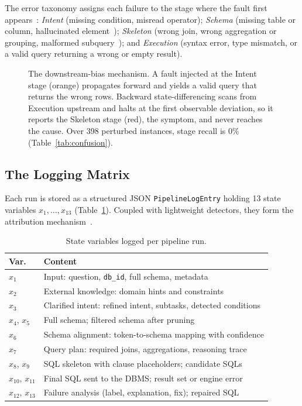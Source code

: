 \documentclass{llncs}
\begin{document}
The error taxonomy assigns each failure to the stage where the fault first
appears~\cite{shen_icl_errors_2026}: \emph{Intent} (missing condition,
misread operator); \emph{Schema} (missing table or column, hallucinated
element~\cite{chang_drspider_2023,lei_emlc_2026}); \emph{Skeleton} (wrong join,
wrong aggregation or grouping, malformed
subquery~\cite{chen_error_detection_2023}); and \emph{Execution} (syntax error,
type mismatch, or a valid query returning a wrong or empty result).

\begin{figure}[t]
    \centering
    \resizebox{0.96\textwidth}{!}{}
    \caption{The downstream-bias mechanism. A fault injected at the Intent stage
    (orange) propagates forward and yields a valid query that returns the wrong
    rows. Backward state-differencing scans from Execution upstream and halts
    at the first observable deviation, so it reports the Skeleton stage (red),
    the symptom, and never reaches the cause. Over 398 perturbed instances, stage
    recall is $0\%$ (Table~\ref{tab:confusion}).}
    \label{fig:running_example}
\end{figure}

\subsection{The Logging Matrix}

Each run is stored as a structured JSON \texttt{PipelineLogEntry} holding 13
state variables $x_1,\dots,x_{13}$ (Table~\ref{tab:logging}). Coupled with
lightweight detectors, they form the attribution
mechanism~\cite{zhang2025which}.

\begin{table}[t]
\centering
\caption{State variables logged per pipeline run.}
\label{tab:logging}
\small
\begin{tabular}{lp{10cm}}
\toprule
Var. & Content \\
\midrule
$x_1$  & Input: question, \texttt{db\_id}, full schema, metadata \\
$x_2$  & External knowledge: domain hints and constraints \\
$x_3$  & Clarified intent: refined intent, subtasks, detected conditions \\
$x_4$, $x_5$ & Full schema; filtered schema after pruning \\
$x_6$  & Schema alignment: token-to-schema mapping with confidence \\
$x_7$  & Query plan: required joins, aggregations, reasoning trace \\
$x_8$, $x_9$ & SQL skeleton with clause placeholders; candidate SQLs \\
$x_{10}$, $x_{11}$ & Final SQL sent to the DBMS; result set or engine error \\
$x_{12}$, $x_{13}$ & Failure analysis (label, explanation, fix); repaired SQL \\
\bottomrule
\end{tabular}
\end{table}
\end{document}
